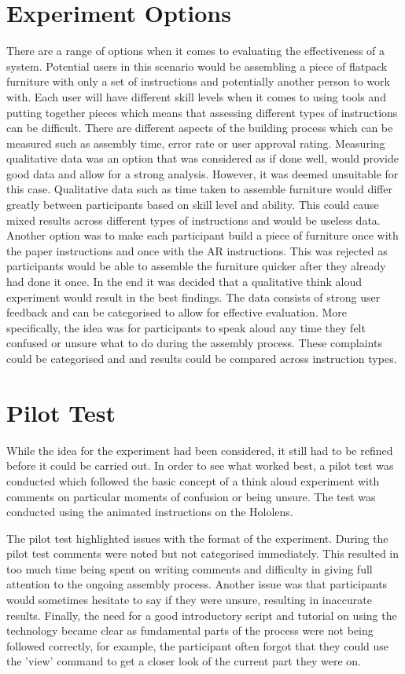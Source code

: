 \documentclass{l4proj}
\begin{document}
\section{Experiment Options}
There are a range of options when it comes to evaluating the effectiveness of a system. Potential users in this scenario would be assembling a piece of flatpack furniture with only a set of instructions and potentially another person to work with. Each user will have different skill levels when it comes to using tools and putting together pieces which means that assessing different types of instructions can be difficult. There are different aspects of the building process which can be measured such as assembly time, error rate or user approval rating. Measuring qualitative data was an option that was considered as if done well, would provide good data and allow for a strong analysis. However, it was deemed unsuitable for this case. Qualitative data such as time taken to assemble furniture would differ greatly between participants based on skill level and ability. This could cause mixed results across different types of instructions and would be useless data. Another option was to make each participant build a piece of furniture once with the paper instructions and once with the AR instructions. This was rejected as participants would be able to assemble the furniture quicker after they already had done it once. In the end it was decided that a qualitative think aloud experiment would result in the best findings. The data consists of strong user feedback and can be categorised to allow for effective evaluation. More specifically, the idea was for participants to speak aloud any time they felt confused or unsure what to do during the assembly process. These complaints could be categorised and and results could be compared across instruction types.
\section{Pilot Test}
While the idea for the experiment had been considered, it still had to be refined before it could be carried out. In order to see what worked best, a pilot test was conducted which followed the basic concept of a think aloud experiment with comments on particular moments of confusion or being unsure. The test was conducted using the animated instructions on the Hololens.

The pilot test highlighted issues with the format of the experiment. During the pilot test comments were noted but not categorised immediately. This resulted in too much time being spent on writing comments and difficulty in giving full attention to the ongoing assembly process. Another issue was that participants would sometimes hesitate to say if they were unsure, resulting in inaccurate results. Finally, the need for a good introductory script and tutorial on using the technology became clear as fundamental parts of the process were not being followed correctly, for example, the participant often forgot that they could use the 'view' command to get a closer look of the current part they were on.
\end{document}
